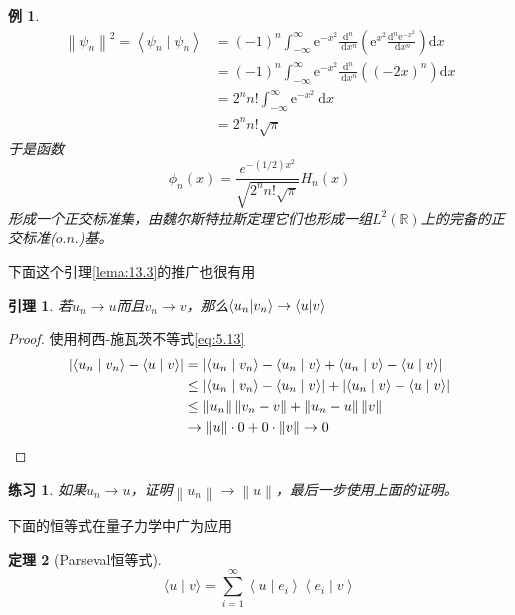 \documentclass[hyperref,UTF8]{ctexbook}
\newtheorem{eg}{例}[chapter]
\newtheorem{theorem}{定理}[chapter]
\newtheorem*{exercise}{练习}
\newtheorem{lemma}[theorem]{引理}
\begin{document}
\begin{eg}
$$
\begin{aligned}
\left\|\psi_{n}\right\|^{2}=\left\langle\psi_{n} \mid \psi_{n}\right\rangle &=(-1)^{n} \int_{-\infty}^{\infty} \mathrm{e}^{-x^{2}} \frac{\mathrm{d}^{n}}{\mathrm{~d} x^{n}}\left(\mathrm{e}^{x^{2}} \frac{\mathrm{d}^{n} \mathrm{e}^{-x^{2}}}{\mathrm{~d} x^{n}}\right) \mathrm{d} x \\
&=(-1)^{n} \int_{-\infty}^{\infty} \mathrm{e}^{-x^{2}} \frac{\mathrm{d}^{n}}{\mathrm{~d} x^{n}}\left((-2 x)^{n}\right) \mathrm{d} x \\
&=2^{n} n ! \int_{-\infty}^{\infty} \mathrm{e}^{-x^{2}} \mathrm{~d} x \\
&=2^{n} n ! \sqrt{\pi}
\end{aligned}
$$
于是函数
\begin{equation}
    \phi_n(x)=\frac{e^{-(1/2)x^2}}{\sqrt{2^{n} n ! \sqrt{\pi}}}H_n(x)
\end{equation}
形成一个正交标准集，由魏尔斯特拉斯定理它们也形成一组\(L^2(\mathbb{R})\)上的完备的正交标准(\(o.n.\))基。
\end{eg}
下面这个引理\ref{lema:13.3}的推广也很有用
\begin{lemma}\label{lema:13.5}
    若\(u_n\rightarrow u\)而且\(v_n\rightarrow v\)，那么\(\braket{u_n|v_n}\rightarrow \braket{u|v}\)
\end{lemma}
\begin{proof}
    使用柯西-施瓦茨不等式\ref{eq:5.13}
    $$
\begin{aligned}
\left|\left\langle u_{n} \mid v_{n}\right\rangle-\langle u \mid v\rangle\right| &=\left|\left\langle u_{n} \mid v_{n}\right\rangle-\left\langle u_{n} \mid v\right\rangle+\left\langle u_{n} \mid v\right\rangle-\langle u \mid v\rangle\right| \\
& \leq\left|\left\langle u_{n} \mid v_{n}\right\rangle-\left\langle u_{n} \mid v\right\rangle\right|+\left|\left\langle u_{n} \mid v\right\rangle-\langle u \mid v\rangle\right| \\
& \leq\left\|u_{n}\right\|\left\|v_{n}-v\right\|+\left\|u_{n}-u\right\|\|v\| \\
& \rightarrow\|u\| \cdot 0+0 \cdot \|v\| \rightarrow 0  \qedhere 
\end{aligned}
$$
\end{proof}
\begin{exercise}
    如果\(u_n\rightarrow u\)，证明\(\left\lVert u_n\right\rVert\rightarrow\left\lVert u\right\rVert  \)，最后一步使用上面的证明。
\end{exercise}
下面的恒等式在量子力学中广为应用
\begin{theorem}[Parseval恒等式]
    \begin{equation}
        \langle u \mid v\rangle=\sum_{i=1}^{\infty}\left\langle u \mid e_{i}\right\rangle\left\langle e_{i} \mid v\right\rangle \label{eq:13.7}
    \end{equation}
\end{theorem}
\end{document}
